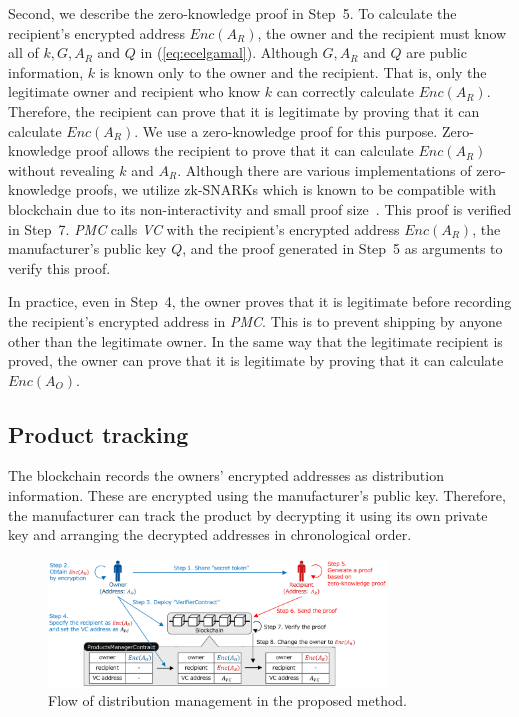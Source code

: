 \documentclass[conference]{IEEEtran}
\begin{document}
Second, we describe the zero-knowledge proof in Step~5.
To calculate the recipient's encrypted address $\textit{Enc}(A_R)$, the owner and the recipient must know all of $k, G, A_R$ and $Q$ in (\ref{eq:ecelgamal}).
Although $G, A_R$ and $Q$ are public information, $k$ is known only to the owner and the recipient.
That is, only the legitimate owner and recipient who know $k$ can correctly calculate $\textit{Enc}(A_R)$.
Therefore, the recipient can prove that it is legitimate by proving that it can calculate $\textit{Enc}(A_R)$.
We use a zero-knowledge proof for this purpose.
Zero-knowledge proof allows the recipient to prove that it can calculate $\textit{Enc}(A_R)$ without revealing $k$ and $A_R$.
Although there are various implementations of zero-knowledge proofs, we utilize zk-SNARKs which is known to be compatible with blockchain due to its non-interactivity and small proof size~\cite{zk-SNARKsInBC}. 
This proof is verified in Step~7.
\textit{PMC} calls \textit{VC} with the recipient's encrypted address $\textit{Enc}(A_R)$, the manufacturer's public key $Q$, and the proof generated in Step~5 as arguments to verify this proof.


In practice, even in Step~4, the owner proves that it is legitimate before recording the recipient's encrypted address in \textit{PMC}.
This is to prevent shipping by anyone other than the legitimate owner.
In the same way that the legitimate recipient is proved, the owner can prove that it is legitimate by proving that it can calculate $\textit{Enc}(A_O)$.

\subsection{Product tracking}
The blockchain records the owners'  encrypted  addresses as distribution information.
These are encrypted using the manufacturer's public key.
Therefore, the manufacturer can track the product by decrypting it using its own private key and arranging the decrypted addresses in chronological order.


\begin{figure}[t]
    \centering
    \includegraphics[width=0.8\textwidth]{flow.eps}
    \caption{Flow of distribution management in the proposed method.
    \label{fig:flow-ProposedMethod}}
\end{figure}
\end{document}
